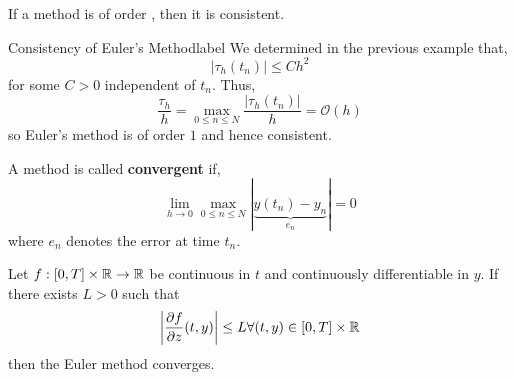 \begin{rmk}
	If a method is of order , then it is consistent.
\end{rmk}

\begin{ex}{Consistency of Euler's Method}{label}
	We determined in the previous example that,
	\[\left|\tau_h\left(t_n\right)\right| \leq C h^2\]
	for some $C > 0$ independent of $t_n$. Thus,
	\[\frac{\tau_h}{h}=\max _{0 \leq n \leq N} \frac{\left|\tau_h\left(t_n\right)\right|}{h}=\mathcal{O}(h)\]
	so Euler's method is of order $1$ and hence consistent.
\end{ex}

\begin{defn}[Convergence]
	A method is called \textbf{convergent} if,
	\[\lim _{h \rightarrow 0} \max _{0 \leq n \leq N}|\underbrace{y(t_n) - y_n}_{e_n}|=0\]
	where $e_n$ denotes the error at time $t_n$.
\end{defn}

\begin{thm}
	Let $f: [0, T] \times \mathbb{R} \rightarrow \mathbb{R}$ be continuous in $t$ and continuously differentiable in $y$. If there exists $L > 0$ such that
	\[\left|\frac{\partial f}{\partial z}(t, y)\right| \leq L \forall (t, y) \in [0, T] \times \mathbb{R}\]
	then the Euler method converges.
\end{thm}

